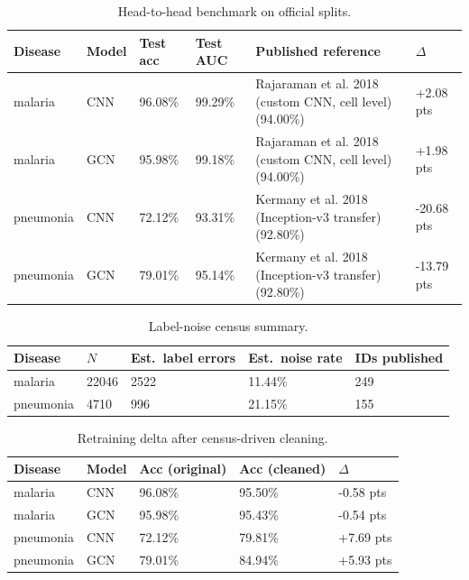 \begin{table}[h]\centering
\caption{Head-to-head benchmark on official splits.}
\begin{tabular}{llllll}
\hline
Disease & Model & Test acc & Test AUC & Published reference & $\Delta$ \\
\hline
malaria & CNN & 96.08\% & 99.29\% & Rajaraman et al. 2018 (custom CNN, cell level) (94.00\%) & +2.08 pts \\
\hline
malaria & GCN & 95.98\% & 99.18\% & Rajaraman et al. 2018 (custom CNN, cell level) (94.00\%) & +1.98 pts \\
\hline
pneumonia & CNN & 72.12\% & 93.31\% & Kermany et al. 2018 (Inception-v3 transfer) (92.80\%) & -20.68 pts \\
\hline
pneumonia & GCN & 79.01\% & 95.14\% & Kermany et al. 2018 (Inception-v3 transfer) (92.80\%) & -13.79 pts \\
\hline
\end{tabular}\end{table}

\begin{table}[h]\centering
\caption{Label-noise census summary.}
\begin{tabular}{lllll}
\hline
Disease & $N$ & Est.\ label errors & Est.\ noise rate & IDs published \\
\hline
malaria & 22046 & 2522 & 11.44\% & 249 \\
\hline
pneumonia & 4710 & 996 & 21.15\% & 155 \\
\hline
\end{tabular}\end{table}

\begin{table}[h]\centering
\caption{Retraining delta after census-driven cleaning.}
\begin{tabular}{lllll}
\hline
Disease & Model & Acc (original) & Acc (cleaned) & $\Delta$ \\
\hline
malaria & CNN & 96.08\% & 95.50\% & -0.58 pts \\
\hline
malaria & GCN & 95.98\% & 95.43\% & -0.54 pts \\
\hline
pneumonia & CNN & 72.12\% & 79.81\% & +7.69 pts \\
\hline
pneumonia & GCN & 79.01\% & 84.94\% & +5.93 pts \\
\hline
\end{tabular}\end{table}
